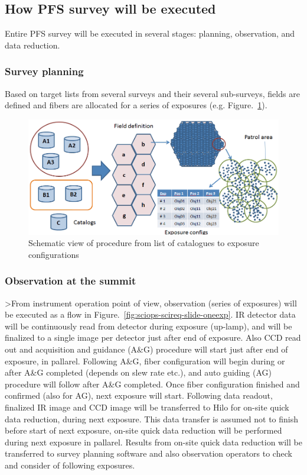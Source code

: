 \documentclass[a4paper,notitlepage]{article}
\begin{document}
\subsection{How PFS survey will be executed}

Entire PFS survey will be executed in several stages: planning, observation, 
and data reduction. 

\subsubsection{Survey planning}

Based on target lists from several surveys and their several sub-surveys, 
fields are defined and fibers are allocated for a series of exposures 
(e.g. Figure.~\ref{fig:sciops-scireq-slide-svyexp}). 



\begin{figure}[htb]
  \begin{center}
    \includegraphics[width=.75\linewidth]{sciops-scireq-slide-svyexp.png}
  \end{center}
  \caption{Schematic view of procedure from list of catalogues to exposure 
    configurations}
  \label{fig:sciops-scireq-slide-svyexp}
\end{figure}


\subsubsection{Observation at the summit}

>From instrument operation point of view, observation (series of exposures) 
will be executed as a flow in Figure.~\ref{fig:sciops-scireq-slide-oneexp}. 
IR detector data will be continuously read from detector during exposure 
(up-lamp), and will be finalized to a single image per detector just after 
end of exposure. Also CCD read out and acquisition and guidance (A\&G) 
procedure will start just after end of exposure, in pallarel. 
Following A\&G, fiber configuration will begin during or after A\&G completed 
(depends on slew rate etc.), and auto guiding (AG) procedure will follow 
after A\&G completed. 
Once fiber configuration finished and confirmed (also for AG), next exposure 
will start. 
Following data readout, finalized IR image and CCD image will be transferred 
to Hilo for on-site quick data reduction, during next exposure. 
This data transfer is assumed not to finish before start of next exposure, 
on-site quick data reduction will be performed during next exposure in 
pallarel. 
Results from on-site quick data reduction will be transferred to survey 
planning software and also observation operators to check and consider of 
following exposures. 
\end{document}
